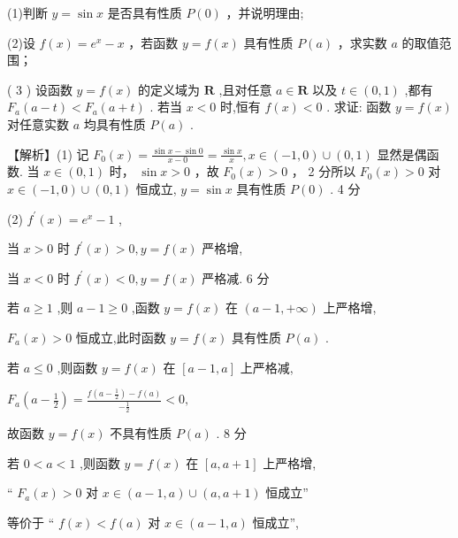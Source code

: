 \documentclass[10pt]{article}
\begin{document}
(1)判断 \(y = \sin x\) 是否具有性质 \(P\left( 0\right)\) ，并说明理由;

(2)设 \(f\left( x\right)  = {e}^{x} - x\) ，若函数 \(y = f\left( x\right)\) 具有性质 \(P\left( a\right)\) ，求实数 \(a\) 的取值范围；

( 3 ) 设函数 \(y = f\left( x\right)\) 的定义域为 \(\mathbf{R}\) ,且对任意 \(a \in  \mathbf{R}\) 以及 \(t \in  \left( {0,1}\right)\) ,都有 \({F}_{a}\left( {a - t}\right)  < {F}_{a}\left( {a + t}\right)\) . 若当 \(x < 0\) 时,恒有 \(f\left( x\right)  < 0\) . 求证: 函数 \(y = f\left( x\right)\) 对任意实数 \(a\) 均具有性质 \(P\left( a\right)\) .

【解析】(1) 记 \({F}_{0}\left( x\right)  = \frac{\sin x - \sin 0}{x - 0} = \frac{\sin x}{x},x \in  \left( {-1,0}\right)  \cup  \left( {0,1}\right)\) 显然是偶函数. 当 \(x \in  \left( {0,1}\right)\) 时， \(\sin x > 0\) ，故 \({F}_{0}\left( x\right)  > 0\) ， 2 分所以 \({F}_{0}\left( x\right)  > 0\) 对 \(x \in  \left( {-1,0}\right)  \cup  \left( {0,1}\right)\) 恒成立, \(y = \sin x\) 具有性质 \(P\left( 0\right)\) . 4 分

(2) \({f}^{\prime }\left( x\right)  = {e}^{x} - 1\) ,

当 \(x > 0\) 时 \({f}^{\prime }\left( x\right)  > 0,y = f\left( x\right)\) 严格增,

当 \(x < 0\) 时 \({f}^{\prime }\left( x\right)  < 0,y = f\left( x\right)\) 严格减. 6 分

若 \(a \geq  1\) ,则 \(a - 1 \geq  0\) ,函数 \(y = f\left( x\right)\) 在 \(\left( {a - 1, + \infty }\right)\) 上严格增,

\({F}_{a}\left( x\right)  > 0\) 恒成立,此时函数 \(y = f\left( x\right)\) 具有性质 \(P\left( a\right)\) .

若 \(a \leq  0\) ,则函数 \(y = f\left( x\right)\) 在 \(\left\lbrack  {a - 1,a}\right\rbrack\) 上严格减,

\({F}_{a}\left( {a - \frac{1}{2}}\right)  = \frac{f\left( {a - \frac{1}{2}}\right)  - f\left( a\right) }{-\frac{1}{2}} < 0,\)

故函数 \(y = f\left( x\right)\) 不具有性质 \(P\left( a\right)\) . 8 分

若 \(0 < a < 1\) ,则函数 \(y = f\left( x\right)\) 在 \(\left\lbrack  {a,a + 1}\right\rbrack\) 上严格增,

“ \({F}_{a}\left( x\right)  > 0\) 对 \(x \in  \left( {a - 1,a}\right)  \cup  \left( {a,a + 1}\right)\) 恒成立”

等价于 “ \(f\left( x\right)  < f\left( a\right)\) 对 \(x \in  \left( {a - 1,a}\right)\) 恒成立”,
\end{document}

